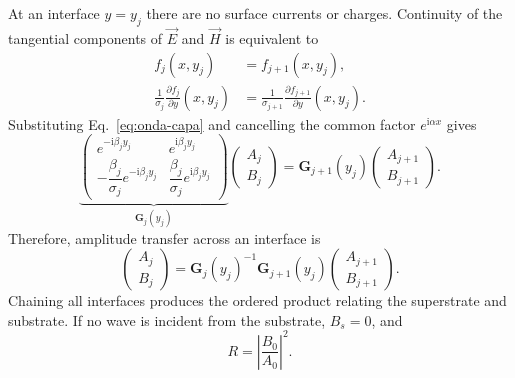 \documentclass[10pt,a4paper]{article}
\newcommand{\ii}{\mathrm{i}}
\newcommand{\B}{\mathbf{B}}
\newcommand{\vE}{\vec{E}}
\newcommand{\vH}{\vec{H}}
\begin{document}
At an interface $y=y_j$ there are no surface currents or charges. Continuity of the tangential components of $\vE$ and $\vH$ is equivalent to
\begin{align}
f_j(x,y_j)&=f_{j+1}(x,y_j),\\
\frac{1}{\sigma_j}\frac{\partial f_j}{\partial y}(x,y_j)
&=\frac{1}{\sigma_{j+1}}\frac{\partial f_{j+1}}{\partial y}(x,y_j).
\label{eq:borde}
\end{align}
Substituting Eq.~\eqref{eq:onda-capa} and cancelling the common factor $e^{\ii\alpha x}$ gives
\begin{equation}
\underbrace{\begin{pmatrix}
e^{-\ii\beta_j y_j}&e^{\ii\beta_j y_j}\\[2pt]
-\dfrac{\beta_j}{\sigma_j}e^{-\ii\beta_j y_j}&
\dfrac{\beta_j}{\sigma_j}e^{\ii\beta_j y_j}
\end{pmatrix}}_{\mathbf{G}_j(y_j)}
\begin{pmatrix}A_j\\B_j\end{pmatrix}
=
\mathbf{G}_{j+1}(y_j)
\begin{pmatrix}A_{j+1}\\B_{j+1}\end{pmatrix}.
\label{eq:interfaz-matricial}
\end{equation}
Therefore, amplitude transfer across an interface is
\begin{equation}
\begin{pmatrix}A_j\\B_j\end{pmatrix}
=\mathbf{G}_j(y_j)^{-1}\mathbf{G}_{j+1}(y_j)
\begin{pmatrix}A_{j+1}\\B_{j+1}\end{pmatrix}.
\label{eq:transferencia-interfaz}
\end{equation}
Chaining all interfaces produces the ordered product relating the superstrate and substrate. If no wave is incident from the substrate, $B_s=0$, and
\begin{equation}
R=\left|\frac{B_0}{A_0}\right|^2.
\label{eq:R-amplitudes}
\end{equation}
\end{document}
